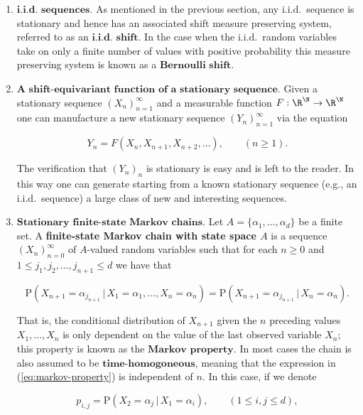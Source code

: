 \begin{enumerate}[label=\arabic*.]
\item $\textbf{i.i.d. sequences.}$ As mentioned in the
previous section, any i.i.d.\ sequence is stationary
and hence has an associated shift measure preserving
system, referred to as an $\textbf{i.i.d. shift}$. In
the case when the i.i.d.\ random variables take on
only a finite number of values with positive
probability this measure preserving system is known as
a $\textbf{Bernoulli shift}$.

\item $\textbf{A shift-equivariant function of a stationary
sequence.}$
Given a stationary sequence $(X_n)_{n=1}^\infty$ and
a measurable function $F:\R^\N\to\R^\N$ one can
manufacture a new stationary sequence
$(Y_n)_{n=1}^\infty$ via the equation

\begin{equation*} \tag{15}\label{eq:shift-equivariant}
Y_n = F(X_n,X_{n+1},X_{n+2},\ldots), \qquad (n\ge 1).
\end{equation*}

\noindent The verification that $(Y_n)_n$ is stationary is easy
and is left to the reader. In this way one can
generate starting from a known stationary sequence
(e.g., an i.i.d.\ sequence) a large class of new and
interesting sequences.

\item $\textbf{Stationary finite-state Markov chains.}$ Let
$A=\{\alpha_1,\ldots,\alpha_d\}$ be a finite set. A
\textbf{finite-state Markov chain with state space $A$} is a
sequence $(X_n)_{n=0}^\infty$ of $A$-valued random
variables such that for each $n\ge0$ and
$1\le j_1,j_2,\ldots,j_{n+1}\le d$ we have that

\begin{equation*} \tag{16}\label{eq:markov-property}
\mathrm{P}(X_{n+1} = \alpha_{j_{n+1}}\,|\,X_1=\alpha_1,\ldots,X_n=\alpha_n)
=
\mathrm{P}(X_{n+1} = \alpha_{j_{n+1}}\,|\,X_n=\alpha_n).
\end{equation*}

\noindent That is, the conditional distribution of $X_{n+1}$
given the $n$ preceding values $X_1,\ldots,X_n$ is
only dependent on the value of the last observed
variable $X_n$; this property is known as the
$\textbf{Markov property}$. In most cases the chain
is also assumed to be $\textbf{time-homogoneous}$,
meaning that the expression in (\ref{eq:markov-property})
is independent of $n$. In this case, if we denote

\[
p_{i,j} = \mathrm{P}(X_{2} = \alpha_j\,|\,X_1=\alpha_i), \qquad (1\le i,j\le d),
\]


\end{enumerate}
